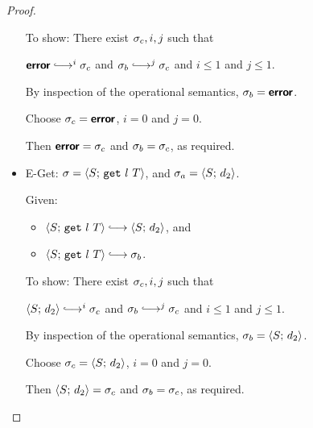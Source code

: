 \begin{proof}
\begin{itemize}
      To show: There exist $\sigma_c, i, j$ such that

      $\error \parstepsto^i \conf_c$ and $\conf_b \parstepsto^j
      \conf_c$ and $i \leq 1$ and $j \leq 1$.

      By inspection of the operational semantics, $\sigma_b = \textbf{\textsf{error}}$.

      Choose $\sigma_c = \textbf{\textsf{error}}$, $i = 0$ and $j = 0$.

      Then $\textbf{\textsf{error}} = \sigma_c$ and $\sigma_b = \sigma_c$, as required.

    \item {\sc E-Get}: $\sigma = \langle S;\, \mbox{\texttt{get}}~l~T \rangle$, and
      $\sigma_a = \langle S;\, d_2 \rangle$.

      Given:
      \begin{itemize}
      \item $\config{S}{\getexp{l}{T}} \parstepsto \config{S}{d_2}$,
        and
      \item $\config{S}{\getexp{l}{T}} \parstepsto \conf_b$.
      \end{itemize}

      To show: There exist $\sigma_c, i, j$ such that

      $\config{S}{d_2} \parstepsto^i \conf_c$ and $\conf_b
      \parstepsto^j \conf_c$ and $i \leq 1$ and $j \leq 1$.

      By inspection of the operational semantics, $\sigma_b =
      \langle S;\, d_2 \rangle$.

      Choose $\sigma_c = \langle S;\, d_2 \rangle$, $i = 0$ and $j = 0$.

      Then $\langle S;\, d_2 \rangle = \sigma_c$ and $\sigma_b = \sigma_c$, as
      required.
  \end{itemize}
\end{proof}
